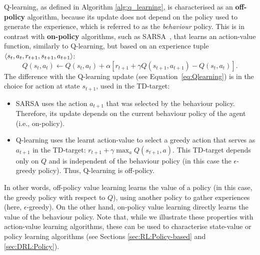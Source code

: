 Q-learning, as defined in Algorithm \ref{alg:q_learning}, is characterised as an \textbf{off-policy} algorithm, because its update does not depend on the policy used to generate the experience, which is referred to as the \textit{behaviour} policy. This is in contrast with \textbf{on-policy} algorithms, such as SARSA~\citep{Rummery1994_SARSA}, that learns an action-value function, similarly to Q-learning, but based on an experience tuple $\langle s_t,a_t,r_{t+1},s_{t+1},\\a_{t+1}\rangle$:
\begin{equation}
    Q(s_t,a_t)\leftarrow Q(s_t,a_t)+\alpha\left[r_{t+1}+\gamma Q(s_{t+1},a_{t+1})-Q(s_t,a_t)\right].
    \label{eq:SARSA}
\end{equation}
The difference with the Q-learning update (see Equation~\ref{eq:Qlearning}) is in the choice for action at state $s_{t+1}$, used in the TD-target:
\begin{itemize}
    \item SARSA uses the action $a_{t+1}$ that was selected by the behaviour policy. Therefore, its update depends on the current behaviour policy of the agent (i.e., on-policy).
    \item Q-learning uses the learnt action-value to select a greedy action that serves as $a_{t+1}$ in the TD-target: $r_{t+1}+\gamma\max_{a}Q(s_{t+1},a)$. This TD-target depends only on $Q$ and is independent of the behaviour policy (in this case the $\epsilon$-greedy policy). Thus, Q-learning is off-policy. 
\end{itemize}
In other words, off-policy value learning learns the value of a policy (in this case, the greedy policy with respect to $Q$), using another policy to gather experiences (here, $\epsilon$-greedy). On the other hand, on-policy value learning directly learns the value of the behaviour policy. Note that, while we illustrate these properties with action-value learning algorithms, these can be used to characterise state-value or policy learning algorithms (see Sections \ref{sec:RL:Policy-based} and \ref{sec:DRL:Policy}).


